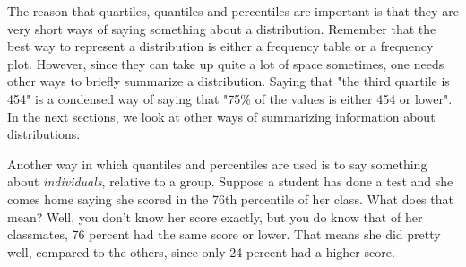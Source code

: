 \documentclass[]{book}\usepackage[]{graphicx}\usepackage[]{color}
\begin{document}
The reason that quartiles, quantiles and percentiles are important is that they are very short ways of saying something about a distribution. Remember that the best way to represent a distribution is either a frequency table or a frequency plot. However, since they can take up quite a lot of space sometimes, one needs other ways to briefly summarize a distribution. Saying that "the third quartile is 454" is a condensed way of saying that "75\% of the values is either 454 or lower". In the next sections, we look at other ways of summarizing information about distributions.

Another way in which quantiles and percentiles are used is to say something about \textit{individuals}, relative to a group. Suppose a student has done a test and she comes home saying she scored in the 76th percentile of her class. What does that mean? Well, you don't know her score exactly, but you do know that of her classmates, 76 percent had the same score or lower. That means she did pretty well, compared to the others, since only 24 percent had a higher score.
\end{document}
